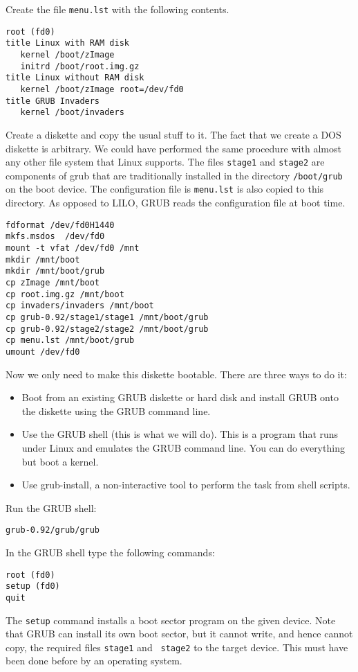 \documentclass[12pt,a4paper]{article}
\begin{document}
Create the file {\tt menu.lst} with the following contents.
\begin{verbatim}
root (fd0)
title Linux with RAM disk
   kernel /boot/zImage
   initrd /boot/root.img.gz
title Linux without RAM disk
   kernel /boot/zImage root=/dev/fd0
title GRUB Invaders
   kernel /boot/invaders
\end{verbatim}

Create a diskette and copy the usual stuff to it. The fact that we
create a DOS diskette is arbitrary. We could have performed the same
procedure with almost any other file system that Linux supports. The
files {\tt stage1} and {\tt stage2} are components of grub that are
traditionally installed in the directory {\tt /boot/grub} on the boot
device. The configuration file is {\tt menu.lst} is also copied to
this directory. As opposed to LILO, GRUB reads the configuration file
at boot time. 
\begin{verbatim}
fdformat /dev/fd0H1440
mkfs.msdos  /dev/fd0
mount -t vfat /dev/fd0 /mnt
mkdir /mnt/boot
mkdir /mnt/boot/grub
cp zImage /mnt/boot
cp root.img.gz /mnt/boot
cp invaders/invaders /mnt/boot
cp grub-0.92/stage1/stage1 /mnt/boot/grub
cp grub-0.92/stage2/stage2 /mnt/boot/grub
cp menu.lst /mnt/boot/grub
umount /dev/fd0
\end{verbatim}

Now we only need to make this diskette bootable. There are three ways
to do it:
\begin{itemize}
\item Boot from an existing GRUB diskette or hard disk and install
  GRUB onto the diskette using the GRUB command line.
\item Use the GRUB shell (this is what we will do). This is a program
  that runs under Linux and emulates the GRUB command line. You can do
  everything but boot a  kernel.
\item Use grub-install, a non-interactive tool to perform the task
  from shell scripts.
\end{itemize}

Run the GRUB shell:
\begin{verbatim}
grub-0.92/grub/grub
\end{verbatim}

In the GRUB shell type the following commands:
\begin{verbatim}
root (fd0)
setup (fd0)
quit
\end{verbatim}

The {\tt setup} command installs a boot sector program on the given
device. Note that GRUB can install its own boot sector, but it cannot
write, and hence cannot copy, the required files {\tt stage1} and {\tt
stage2} to the target device. This must have been done before by an
operating system. 
\end{document}
